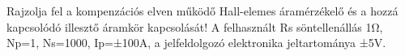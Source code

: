 \begin{example}

Rajzolja fel a kompenzációs elven működő Hall-elemes áramérzékelő és a hozzá kapcsolódó illesztő áramkör kapcsolását! A felhasznált Rs söntellenállás 1Ω, Np=1, Ns=1000, Ip=±100A, a jelfeldolgozó elektronika jeltartománya ±5V.

\tcbline
\vspace{1mm}

\solution

\end{example}